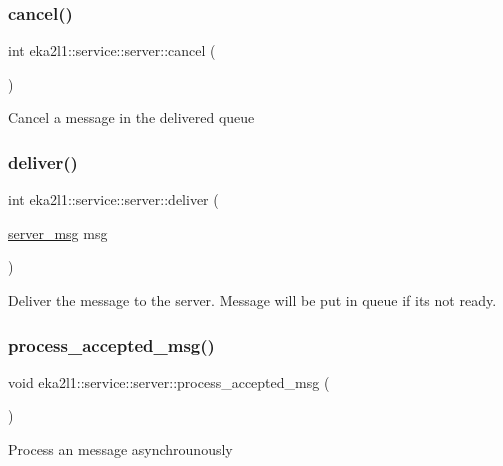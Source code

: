 \subsubsection{\texorpdfstring{cancel()}{cancel()}}
{\footnotesize\ttfamily int eka2l1\+::service\+::server\+::cancel (\begin{DoxyParamCaption}{ }\end{DoxyParamCaption})}

Cancel a message in the delivered queue \mbox{\label{classeka2l1_1_1service_1_1server_afe6a3a01607dc045a9767ff57d57c266}} 
\subsubsection{\texorpdfstring{deliver()}{deliver()}}
{\footnotesize\ttfamily int eka2l1\+::service\+::server\+::deliver (\begin{DoxyParamCaption}\item[{\mbox{\hyperlink{structeka2l1_1_1service_1_1server__msg}{server\+\_\+msg}}}]{msg }\end{DoxyParamCaption})}

Deliver the message to the server. Message will be put in queue if it\textquotesingle{}s not ready. \mbox{\label{classeka2l1_1_1service_1_1server_a6b80c69c4d159733c02a62c631c9f960}} 
\subsubsection{\texorpdfstring{process\+\_\+accepted\+\_\+msg()}{process\_accepted\_msg()}}
{\footnotesize\ttfamily void eka2l1\+::service\+::server\+::process\+\_\+accepted\+\_\+msg (\begin{DoxyParamCaption}{ }\end{DoxyParamCaption})}

Process an message asynchrounously \mbox{\label{classeka2l1_1_1service_1_1server_aa28629eb0ef30c5ebc645d1f1e0a0730}} 
